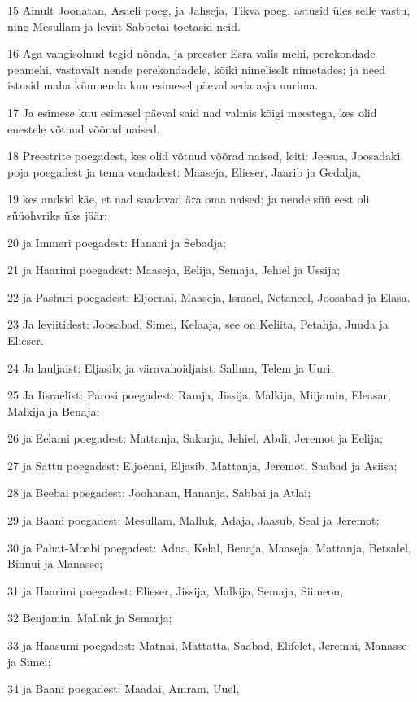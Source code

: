 \par 15 Ainult Joonatan, Asaeli poeg, ja Jahseja, Tikva poeg, astusid üles selle vastu, ning Mesullam ja leviit Sabbetai toetasid neid.
\par 16 Aga vangisolnud tegid nõnda, ja preester Esra valis mehi, perekondade peamehi, vastavalt nende perekondadele, kõiki nimeliselt nimetades; ja need istusid maha kümnenda kuu esimesel päeval seda asja uurima.
\par 17 Ja esimese kuu esimesel päeval said nad valmis kõigi meestega, kes olid enestele võtnud võõrad naised.
\par 18 Preestrite poegadest, kes olid võtnud võõrad naised, leiti: Jeesua, Joosadaki poja poegadest ja tema vendadest: Maaseja, Elieser, Jaarib ja Gedalja,
\par 19 kes andsid käe, et nad saadavad ära oma naised; ja nende süü eest oli süüohvriks üks jäär;
\par 20 ja Immeri poegadest: Hanani ja Sebadja;
\par 21 ja Haarimi poegadest: Maaseja, Eelija, Semaja, Jehiel ja Ussija;
\par 22 ja Pashuri poegadest: Eljoenai, Maaseja, Ismael, Netaneel, Joosabad ja Elasa.
\par 23 Ja leviitidest: Joosabad, Simei, Kelaaja, see on Keliita, Petahja, Juuda ja Elieser.
\par 24 Ja lauljaist: Eljasib; ja väravahoidjaist: Sallum, Telem ja Uuri.
\par 25 Ja Iisraelist: Parosi poegadest: Ramja, Jissija, Malkija, Miijamin, Eleasar, Malkija ja Benaja;
\par 26 ja Eelami poegadest: Mattanja, Sakarja, Jehiel, Abdi, Jeremot ja Eelija;
\par 27 ja Sattu poegadest: Eljoenai, Eljasib, Mattanja, Jeremot, Saabad ja Asiisa;
\par 28 ja Beebai poegadest: Joohanan, Hananja, Sabbai ja Atlai;
\par 29 ja Baani poegadest: Mesullam, Malluk, Adaja, Jaasub, Seal ja Jeremot;
\par 30 ja Pahat-Moabi poegadest: Adna, Kelal, Benaja, Maaseja, Mattanja, Betsalel, Binnui ja Manasse;
\par 31 ja Haarimi poegadest: Elieser, Jissija, Malkija, Semaja, Siimeon,
\par 32 Benjamin, Malluk ja Semarja;
\par 33 ja Haasumi poegadest: Matnai, Mattatta, Saabad, Elifelet, Jeremai, Manasse ja Simei;
\par 34 ja Baani poegadest: Maadai, Amram, Uuel,
